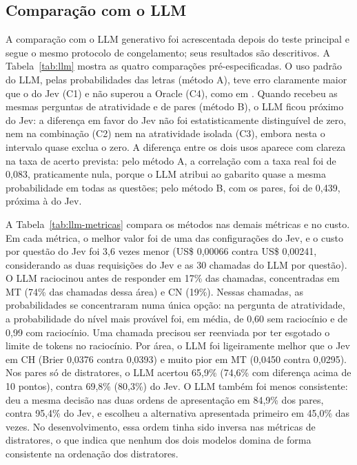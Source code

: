 \subsection{Comparação com o LLM}\label{sec:res-llm}

A comparação com o LLM generativo foi acrescentada depois do teste principal e segue o mesmo protocolo de congelamento; seus resultados são descritivos. A Tabela~\ref{tab:llm} mostra as quatro comparações pré-especificadas. O uso padrão do LLM, pelas probabilidades das letras (método A), teve erro claramente maior que o do Jev (C1) e não superou a Oracle (C4), como em \citet{saeuberli2025}. Quando recebeu as mesmas perguntas de atratividade e de pares (método B), o LLM ficou próximo do Jev: a diferença em favor do Jev não foi estatisticamente distinguível de zero, nem na combinação (C2) nem na atratividade isolada (C3), embora nesta o intervalo quase exclua o zero. A diferença entre os dois usos aparece com clareza na taxa de acerto prevista: pelo método A, a correlação com a taxa real foi de 0,083, praticamente nula, porque o LLM atribui ao gabarito quase a mesma probabilidade em todas as questões; pelo método B, com os pares, foi de 0,439, próxima à do Jev.



A Tabela~\ref{tab:llm-metricas} compara os métodos nas demais métricas e no custo. Em cada métrica, o melhor valor foi de uma das configurações do Jev, e o custo por questão do Jev foi 3,6 vezes menor (US\$ 0,00066 contra US\$ 0,00241, considerando as duas requisições do Jev e as 30 chamadas do LLM por questão). O LLM raciocinou antes de responder em 17\% das chamadas, concentradas em MT (74\% das chamadas dessa área) e CN (19\%). Nessas chamadas, as probabilidades se concentraram numa única opção: na pergunta de atratividade, a probabilidade do nível mais provável foi, em média, de 0,60 sem raciocínio e de 0,99 com raciocínio. Uma chamada precisou ser reenviada por ter esgotado o limite de tokens no raciocínio. Por área, o LLM foi ligeiramente melhor que o Jev em CH (Brier 0,0376 contra 0,0393) e muito pior em MT (0,0450 contra 0,0295). Nos pares só de distratores, o LLM acertou 65,9\% (74,6\% com diferença acima de 10 pontos), contra 69,8\% (80,3\%) do Jev. O LLM também foi menos consistente: deu a mesma decisão nas duas ordens de apresentação em 84,9\% dos pares, contra 95,4\% do Jev, e escolheu a alternativa apresentada primeiro em 45,0\% das vezes. No desenvolvimento, essa ordem tinha sido inversa nas métricas de distratores, o que indica que nenhum dos dois modelos domina de forma consistente na ordenação dos distratores.


